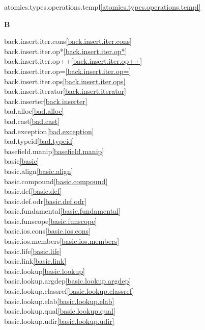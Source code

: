 \begin{multicols}{2}
atomics.types.operations.templ\quad\ref{atomics.types.operations.templ}\\
\par \textbf{B}\par
back.insert.iter.cons\quad\ref{back.insert.iter.cons}\\
back.insert.iter.op*\quad\ref{back.insert.iter.op*}\\
back.insert.iter.op++\quad\ref{back.insert.iter.op++}\\
back.insert.iter.op=\quad\ref{back.insert.iter.op=}\\
back.insert.iter.ops\quad\ref{back.insert.iter.ops}\\
back.insert.iterator\quad\ref{back.insert.iterator}\\
back.inserter\quad\ref{back.inserter}\\
bad.alloc\quad\ref{bad.alloc}\\
bad.cast\quad\ref{bad.cast}\\
bad.exception\quad\ref{bad.exception}\\
bad.typeid\quad\ref{bad.typeid}\\
basefield.manip\quad\ref{basefield.manip}\\
basic\quad\ref{basic}\\
basic.align\quad\ref{basic.align}\\
basic.compound\quad\ref{basic.compound}\\
basic.def\quad\ref{basic.def}\\
basic.def.odr\quad\ref{basic.def.odr}\\
basic.fundamental\quad\ref{basic.fundamental}\\
basic.funscope\quad\ref{basic.funscope}\\
basic.ios.cons\quad\ref{basic.ios.cons}\\
basic.ios.members\quad\ref{basic.ios.members}\\
basic.life\quad\ref{basic.life}\\
basic.link\quad\ref{basic.link}\\
basic.lookup\quad\ref{basic.lookup}\\
basic.lookup.argdep\quad\ref{basic.lookup.argdep}\\
basic.lookup.classref\quad\ref{basic.lookup.classref}\\
basic.lookup.elab\quad\ref{basic.lookup.elab}\\
basic.lookup.qual\quad\ref{basic.lookup.qual}\\
basic.lookup.udir\quad\ref{basic.lookup.udir}\\

\end{multicols}
